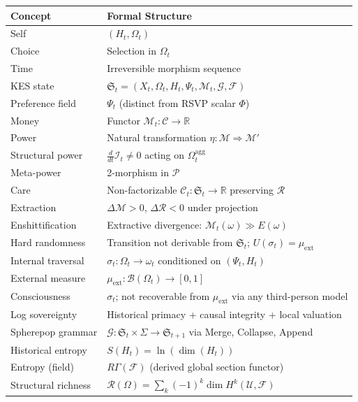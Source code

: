 \documentclass[11pt,a4paper]{article}
\theoremstyle{definition}
\theoremstyle{remark}
\begin{document}
\begin{center}
\begin{tabular}{ll}
\toprule
Concept & Formal Structure \\
\midrule
Self & $(H_t, \Omega_t)$ \\
Choice & Selection in $\Omega_t$ \\
Time & Irreversible morphism sequence \\
KES state & $\mathfrak{S}_t = (X_t, \Omega_t, H_t, \Psi_t, \mathcal{M}_t, \mathcal{G}, \mathcal{F})$ \\
Preference field & $\Psi_t$ (distinct from RSVP scalar $\Phi$) \\
Money & Functor $\mathcal{M}_t : \mathcal{C} \to \mathbb{R}$ \\
Power & Natural transformation $\eta : \mathcal{M} \Rightarrow \mathcal{M}'$ \\
Structural power & $\tfrac{d}{dt}\mathcal{I}_t \neq 0$ acting on $\Omega_t^{\mathrm{agg}}$ \\
Meta-power & 2-morphism in $\mathcal{P}$ \\
Care & Non-factorizable $\mathcal{C}_t : \mathfrak{S}_t \to \mathbb{R}$ preserving $\mathcal{R}$ \\
Extraction & $\Delta\mathcal{M} > 0$, $\Delta\mathcal{R} < 0$ under projection \\
Enshittification & Extractive divergence: $\mathcal{M}_t(\omega) \gg E(\omega)$ \\
Hard randomness & Transition not derivable from $\mathfrak{S}_t$; $U(\sigma_t) = \mu_{\mathrm{ext}}$ \\
Internal traversal & $\sigma_t : \Omega_t \to \omega_t$ conditioned on $(\Psi_t, H_t)$ \\
External measure & $\mu_{\mathrm{ext}} : \mathcal{B}(\Omega_t) \to [0,1]$ \\
Consciousness & $\sigma_t$; not recoverable from $\mu_{\mathrm{ext}}$ via any third-person model \\
Log sovereignty & Historical primacy + causal integrity + local valuation \\
Spherepop grammar & $\mathcal{G} : \mathfrak{S}_t \times \Sigma \to \mathfrak{S}_{t+1}$ via Merge, Collapse, Append \\
Historical entropy & $S(H_t) = \ln(\dim(H_t))$ \\
Entropy (field) & $R\Gamma(\mathcal{F})$ (derived global section functor) \\
Structural richness & $\mathcal{R}(\Omega) = \sum_k (-1)^k \dim H^k(\mathcal{U}, \mathcal{F})$ \\
\bottomrule
\end{tabular}
\end{center}
\end{document}
